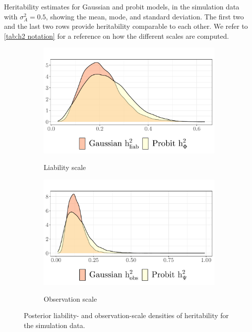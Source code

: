 \begin{table}[ht]\centering


\caption[Heritability means for all scales in simulation]{Heritability estimates for Gaussian and probit models, in the simulation data with $\sigma^2_A=0.5$, showing the mean, mode, and standard deviation. The first two and the last two rows provide heritability comparable to each other. We refer to \autoref{tab:h2 notation} for a reference on how the different scales are computed.}
\label{tab:heritability simulation}
\end{table}

\begin{figure}
    \centering
    \begin{subfigure}{0.49\textwidth}
        \centering
        \caption{Liability scale}
        \includegraphics{figures/heritability_simulation_liabscale.pdf}
        \label{fig:posterior simulation heritability:liability}
    \end{subfigure}
    \begin{subfigure}{0.49\textwidth}
        \centering
        \caption{Observation scale}
        \includegraphics{figures/heritability_simulation_obsscale.pdf}
        \label{fig:posterior simulation heritability:observation}
    \end{subfigure}
    \caption[Heritability density for simulation data]{Posterior liability- and observation-scale densities of heritability for the simulation data.}
    \label{fig:posterior simulation heritability}
\end{figure}


